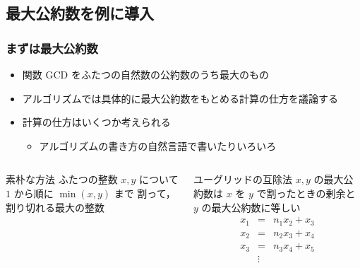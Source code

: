 \subsection{最大公約数を例に導入}
\begin{frame}
\frametitle{まずは最大公約数}
  \begin{itemize}
\item 関数 GCD をふたつの自然数の公約数のうち最大のもの
\item アルゴリズムでは具体的に最大公約数をもとめる計算の仕方を議論する
\item 計算の仕方はいくつか考えられる
    \begin{itemize}
\item アルゴリズムの書き方の自然言語で書いたりいろいろ
    \end{itemize}
  \end{itemize}
  \begin{columns}[t]
    \begin{column}{0.5\textwidth}
      \begin{block}{素朴な方法}
ふたつの整数 \(x, y\) について $1$ から順に \(\min(x,y)\) まで
割って，割り切れる最大の整数
      \end{block}
    \end{column}
    \begin{column}{0.5\textwidth}
      \begin{block}{ユーグリッドの互除法}
\scriptsize
\(x, y\) の最大公約数は $x$ を $y$ で割ったときの剰余と $y$ の最大公約数に等しい
        \begin{displaymath}
          \begin{array}{rcl}
x_1 &=& n_1 x_2 + x_3\\
x_2 &=& n_2 x_3 + x_4\\
x_3 &=& n_3 x_4 + x_5\\
&\vdots&
          \end{array}
        \end{displaymath}
      \end{block}
    \end{column}
  \end{columns}
\end{frame}
